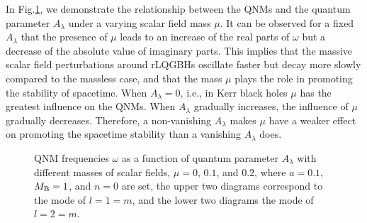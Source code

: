 \documentclass[12pt]{article}
\begin{document}
In Fig.\ref{mu_omega}, we demonstrate the relationship between the QNMs and the quantum parameter $A_\lambda$ under a varying scalar field mass $\mu$. 
It can be observed for a fixed $A_\lambda$ that the presence of $\mu$ leads to an increase of the real parts of $\omega$ but a decrease of the absolute value of imaginary parts. 
This implies that the massive scalar field perturbations around rLQGBHs oscillate  faster but decay more slowly compared to the massless case, and that the mass $\mu$ plays the role in promoting the stability of spacetime.
When $A_\lambda=0$, i.e., in Kerr black holes $\mu$ has the greatest influence on the QNMs. 
When $A_\lambda$ gradually increases, the influence of $\mu$ gradually decreases. 
Therefore, a non-vanishing $A_\lambda$ makes $\mu$ have a weaker effect on promoting the spacetime stability than a vanishing $A_\lambda$  does.
   
\begin{figure}[t]
\centering
{}
\caption{QNM frequencies $\omega$ as a function of quantum parameter $A_\lambda$ with different masses of scalar fields, $\mu=0$, $0.1$, and $0.2$, where $a=0.1$, $M_{\rm B}=1$, and $n=0$ are set, the upper two diagrams correspond to the mode of $l=1=m$, and the lower two diagrams the mode of $l=2=m$.}
\label{mu_omega}
\end{figure}
    
    
\end{document}

